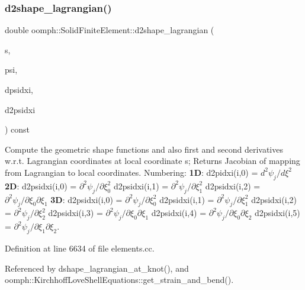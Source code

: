 \subsubsection{\texorpdfstring{d2shape\+\_\+lagrangian()}{d2shape\_lagrangian()}}
{\footnotesize\ttfamily double oomph\+::\+Solid\+Finite\+Element\+::d2shape\+\_\+lagrangian (\begin{DoxyParamCaption}\item[{const \hyperlink{classoomph_1_1Vector}{Vector}$<$ double $>$ \&}]{s,  }\item[{\hyperlink{classoomph_1_1Shape}{Shape} \&}]{psi,  }\item[{\hyperlink{classoomph_1_1DShape}{D\+Shape} \&}]{dpsidxi,  }\item[{\hyperlink{classoomph_1_1DShape}{D\+Shape} \&}]{d2psidxi }\end{DoxyParamCaption}) const}



Compute the geometric shape functions and also first and second derivatives w.\+r.\+t. Lagrangian coordinates at local coordinate s; Returns Jacobian of mapping from Lagrangian to local coordinates. Numbering\+: {\bfseries 1D}\+: d2pidxi(i,0) = $ d^2 \psi_j / d \xi^2 $ {\bfseries 2D}\+: d2psidxi(i,0) = $ \partial^2 \psi_j / \partial \xi_0^2 $ d2psidxi(i,1) = $ \partial^2 \psi_j / \partial \xi_1^2 $ d2psidxi(i,2) = $ \partial^2 \psi_j / \partial \xi_0 \partial \xi_1 $ {\bfseries 3D}\+: d2psidxi(i,0) = $ \partial^2 \psi_j / \partial \xi_0^2 $ d2psidxi(i,1) = $ \partial^2 \psi_j / \partial \xi_1^2 $ d2psidxi(i,2) = $ \partial^2 \psi_j / \partial \xi_2^2 $ d2psidxi(i,3) = $ \partial^2 \psi_j/\partial \xi_0 \partial \xi_1 $ d2psidxi(i,4) = $ \partial^2 \psi_j/\partial \xi_0 \partial \xi_2 $ d2psidxi(i,5) = $ \partial^2 \psi_j/\partial \xi_1 \partial \xi_2 $. 



Definition at line 6634 of file elements.\+cc.



Referenced by dshape\+\_\+lagrangian\+\_\+at\+\_\+knot(), and oomph\+::\+Kirchhoff\+Love\+Shell\+Equations\+::get\+\_\+strain\+\_\+and\+\_\+bend().

\mbox{\label{classoomph_1_1SolidFiniteElement_a69d17ec5fa308adae42e2f3171649bfe}} 
